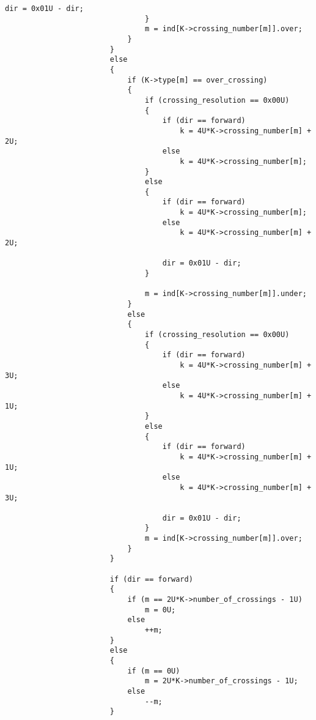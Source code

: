 \documentclass{article}
\theoremstyle{plain}
\begin{document}
\begin{lstlisting}[style=CStyle, gobble=12]
                                    dir = 0x01U - dir;
                                }
                                m = ind[K->crossing_number[m]].over;
                            }
                        }
                        else
                        {
                            if (K->type[m] == over_crossing)
                            {
                                if (crossing_resolution == 0x00U)
                                {
                                    if (dir == forward)
                                        k = 4U*K->crossing_number[m] + 2U;
                                    else
                                        k = 4U*K->crossing_number[m];
                                }
                                else
                                {
                                    if (dir == forward)
                                        k = 4U*K->crossing_number[m];
                                    else
                                        k = 4U*K->crossing_number[m] + 2U;

                                    dir = 0x01U - dir;
                                }

                                m = ind[K->crossing_number[m]].under;
                            }
                            else
                            {
                                if (crossing_resolution == 0x00U)
                                {
                                    if (dir == forward)
                                        k = 4U*K->crossing_number[m] + 3U;
                                    else
                                        k = 4U*K->crossing_number[m] + 1U;
                                }
                                else
                                {
                                    if (dir == forward)
                                        k = 4U*K->crossing_number[m] + 1U;
                                    else
                                        k = 4U*K->crossing_number[m] + 3U;

                                    dir = 0x01U - dir;
                                }
                                m = ind[K->crossing_number[m]].over;
                            }
                        }

                        if (dir == forward)
                        {
                            if (m == 2U*K->number_of_crossings - 1U)
                                m = 0U;
                            else
                                ++m;
                        }
                        else
                        {
                            if (m == 0U)
                                m = 2U*K->number_of_crossings - 1U;
                            else
                                --m;
                        }


\end{lstlisting}
\end{document}
